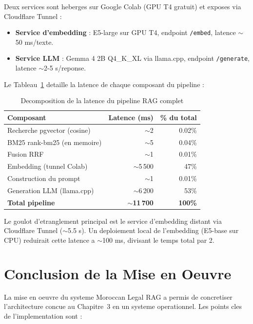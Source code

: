 Deux services sont heberges sur Google Colab (GPU T4 gratuit) et exposes via Cloudflare Tunnel :

\begin{itemize}
    \item \textbf{Service d'embedding} : E5-large sur GPU T4, endpoint \texttt{/embed}, latence $\sim$50 ms/texte.
    \item \textbf{Service LLM} : Gemma 4 2B Q4\_K\_XL via llama.cpp, endpoint \texttt{/generate}, latence $\sim$2-5 s/reponse.
\end{itemize}

Le Tableau~\ref{tab:latency-breakdown} detaille la latence de chaque composant du pipeline :

\begin{table}[h]
\centering
\renewcommand{\arraystretch}{1.3}
\begin{tabular}{|l|r|r|}
\hline
\rowcolor{LightBlue}
\textbf{\color{PrimaryBlue}Composant} & \textbf{\color{PrimaryBlue}Latence (ms)} & \textbf{\color{PrimaryBlue}\% du total} \\
\hline
Recherche pgvector (cosine) & $\sim$2 & 0.02\% \\
BM25 rank-bm25 (en memoire) & $\sim$5 & 0.04\% \\
Fusion RRF & $\sim$1 & 0.01\% \\
Embedding (tunnel Colab) & $\sim$5\,500 & 47\% \\
Construction du prompt & $\sim$1 & 0.01\% \\
Generation LLM (llama.cpp) & $\sim$6\,200 & 53\% \\
\hline
\textbf{Total pipeline} & \textbf{$\sim$11\,700} & \textbf{100\%} \\
\hline
\end{tabular}
\caption{Decomposition de la latence du pipeline RAG complet}
\label{tab:latency-breakdown}
\end{table}

Le goulot d'etranglement principal est le service d'embedding distant via Cloudflare Tunnel ($\sim$5.5 s). Un deploiement local de l'embedding (E5-base sur CPU) reduirait cette latence a $\sim$100 ms, divisant le temps total par 2.

\section{Conclusion de la Mise en Oeuvre}

La mise en oeuvre du systeme Moroccan Legal RAG a permis de concretiser l'architecture concue au Chapitre~3 en un systeme operationnel. Les points cles de l'implementation sont :


